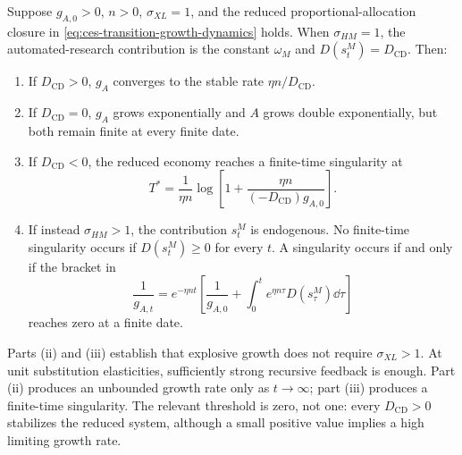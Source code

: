\begin{conditionalresult}
\label{cond:singularity-conditions}
Suppose $g_{A,0}>0$, $n>0$, $\sigma_{XL}=1$, and the reduced
proportional-allocation closure in \eqref{eq:ces-transition-growth-dynamics} holds.
When $\sigma_{HM}=1$, the automated-research contribution is the constant
$\omega_M$ and $D(s^M_t)=D_{\mathrm{CD}}$. Then:
\begin{enumerate}[label=(\roman*)]
    \item If $D_{\mathrm{CD}}>0$, $g_A$ converges to the stable rate
    $\eta n/D_{\mathrm{CD}}$.
    \item If $D_{\mathrm{CD}}=0$, $g_A$ grows exponentially and $A$ grows double
    exponentially, but both remain finite at every finite date.
    \item If $D_{\mathrm{CD}}<0$, the reduced economy reaches a finite-time
    singularity at
    \begin{equation}
        T^*
        =
        \frac{1}{\eta n}
        \log\left[
            1+\frac{\eta n}{(-D_{\mathrm{CD}})g_{A,0}}
        \right].
        \label{eq:constant-feedback-singularity-time}
    \end{equation}
    \pagebreak
    \item If instead $\sigma_{HM}>1$, the contribution $s^M_t$ is endogenous. No
    finite-time singularity occurs if $D(s^M_t)\geq0$ for every $t$. A singularity
    occurs if and only if the bracket in
    \begin{equation}
        \frac{1}{g_{A,t}}
        =
        e^{-\eta nt}
        \left[
            \frac{1}{g_{A,0}}
            +\int_0^t e^{\eta n\tau}D(s^M_\tau)\dd\tau
        \right]
        \label{eq:time-varying-singularity-condition}
    \end{equation}
    reaches zero at a finite date.
\end{enumerate}
\end{conditionalresult}

Parts (ii) and (iii) establish that explosive growth does not require
$\sigma_{XL}>1$. At unit substitution elasticities, sufficiently strong recursive
feedback is enough. Part (ii) produces an unbounded growth rate only as
$t\to\infty$; part (iii) produces a finite-time singularity. The relevant threshold
is zero, not one: every $D_{\mathrm{CD}}>0$ stabilizes the reduced system, although
a small positive value implies a high limiting growth rate.

